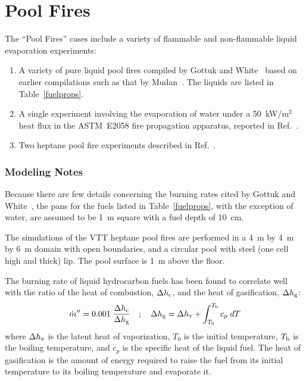 \FloatBarrier

\section{Pool Fires}
\label{Pool_Fires_Description}

The ``Pool Fires'' cases include a variety of flammable and non-flammable liquid evaporation experiments:
\begin{enumerate}
\item A variety of pure liquid pool fires compiled by Gottuk and White~\cite{SFPE:Gottuk_and_White} based on earlier compilations such as that by Mudan~\cite{Mudan:1984}. The liquids are listed in Table~\ref{fuelprops}.
\item A single experiment involving the evaporation of water under a 50~kW/m$^2$ heat flux in the ASTM~E2058 fire propagation apparatus, reported in Ref.~\cite{SFPE:Tewarson}.
\item Two heptane pool fire experiments described in Ref.~\cite{Sikanen:2016}.
\end{enumerate}

\subsubsection{Modeling Notes}

Because there are few details concerning the burning rates cited by Gottuk and White~\cite{SFPE:Gottuk_and_White}, the pans for the fuels listed in Table~\ref{fuelprops}, with the exception of water, are assumed to be 1~m square with a fuel depth of 10~cm.

The simulations of the VTT heptane pool fires are performed in a 4~m by 4~m by 6~m domain with open boundaries, and a circular pool with steel (one cell high and thick) lip. The pool surface is 1~m above the floor.

The burning rate of liquid hydrocarbon fuels has been found to correlate well with the ratio of the heat of combustion, $\Delta h_{\rm c}$, and the heat of gasification, $\Delta h_{\rm g}$:
\begin{equation}
\dot{m}''= 0.001 \; \frac{\Delta h_{\rm c}}{\Delta h_{\rm g}} \quad ; \quad \Delta h_{\rm g} = \Delta h_{\rm v} + \int_{T_0}^{T_{\rm b}} c_p \; dT
\label{poolcorr}
\end{equation}
where $\Delta h_{\rm v}$ is the latent heat of vaporization, $T_0$ is the initial temperature, $T_{\rm b}$ is the boiling temperature, and $c_p$ is the specific heat of the liquid fuel. The heat of gasification is the amount of energy required to raise the fuel from its initial temperature to its boiling temperature and evaporate it.

